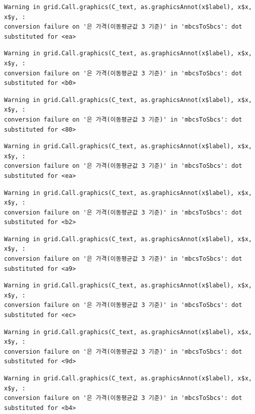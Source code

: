 \documentclass[
  letterpaper,
  DIV=11,
  numbers=noendperiod]{scrreprt}
\begin{document}
\begin{verbatim}
Warning in grid.Call.graphics(C_text, as.graphicsAnnot(x$label), x$x, x$y, :
conversion failure on '은 가격(이동평균값 3 기준)' in 'mbcsToSbcs': dot
substituted for <ea>
\end{verbatim}

\begin{verbatim}
Warning in grid.Call.graphics(C_text, as.graphicsAnnot(x$label), x$x, x$y, :
conversion failure on '은 가격(이동평균값 3 기준)' in 'mbcsToSbcs': dot
substituted for <b0>
\end{verbatim}

\begin{verbatim}
Warning in grid.Call.graphics(C_text, as.graphicsAnnot(x$label), x$x, x$y, :
conversion failure on '은 가격(이동평균값 3 기준)' in 'mbcsToSbcs': dot
substituted for <80>
\end{verbatim}

\begin{verbatim}
Warning in grid.Call.graphics(C_text, as.graphicsAnnot(x$label), x$x, x$y, :
conversion failure on '은 가격(이동평균값 3 기준)' in 'mbcsToSbcs': dot
substituted for <ea>
\end{verbatim}

\begin{verbatim}
Warning in grid.Call.graphics(C_text, as.graphicsAnnot(x$label), x$x, x$y, :
conversion failure on '은 가격(이동평균값 3 기준)' in 'mbcsToSbcs': dot
substituted for <b2>
\end{verbatim}

\begin{verbatim}
Warning in grid.Call.graphics(C_text, as.graphicsAnnot(x$label), x$x, x$y, :
conversion failure on '은 가격(이동평균값 3 기준)' in 'mbcsToSbcs': dot
substituted for <a9>
\end{verbatim}

\begin{verbatim}
Warning in grid.Call.graphics(C_text, as.graphicsAnnot(x$label), x$x, x$y, :
conversion failure on '은 가격(이동평균값 3 기준)' in 'mbcsToSbcs': dot
substituted for <ec>
\end{verbatim}

\begin{verbatim}
Warning in grid.Call.graphics(C_text, as.graphicsAnnot(x$label), x$x, x$y, :
conversion failure on '은 가격(이동평균값 3 기준)' in 'mbcsToSbcs': dot
substituted for <9d>
\end{verbatim}

\begin{verbatim}
Warning in grid.Call.graphics(C_text, as.graphicsAnnot(x$label), x$x, x$y, :
conversion failure on '은 가격(이동평균값 3 기준)' in 'mbcsToSbcs': dot
substituted for <b4>
\end{verbatim}
\end{document}
